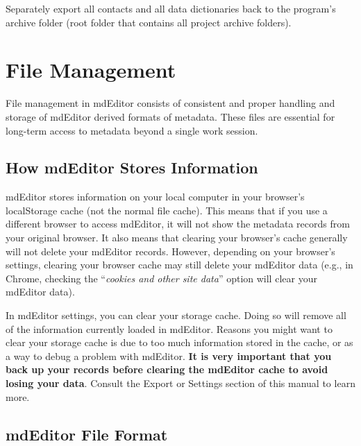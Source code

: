 \documentclass[
]{book}
\makeatletter
\newenvironment{kframe}{%
\medskip{}
\setlength{\fboxsep}{.8em}
 \def\at@end@of@kframe{}%
 \ifinner\ifhmode%
  \def\at@end@of@kframe{\end{minipage}}%
  \begin{minipage}{\columnwidth}%
 \fi\fi%
 \def\FrameCommand##1{\hskip\@totalleftmargin \hskip-\fboxsep
 \colorbox{shadecolor}{##1}\hskip-\fboxsep
     \hskip-\linewidth \hskip-\@totalleftmargin \hskip\columnwidth}%
 \MakeFramed {\advance\hsize-\width
   \@totalleftmargin\z@ \linewidth\hsize
   \@setminipage}}%
 {\par\unskip\endMakeFramed%
 \at@end@of@kframe}
\newenvironment{rmdblock}[1]
  {
  \begin{itemize}
  \renewcommand{\labelitemi}{
    \raisebox{-.7\height}[0pt][0pt]{
      {\setkeys{Gin}{width=3em,keepaspectratio}\texttt{[image: images/\#1]}}
    }
  }
  \setlength{\fboxsep}{1em}
  \begin{kframe}
  \item
  }
  {
  \end{kframe}
  \end{itemize}
  }
\newenvironment{rmdcaution}
  {\begin{rmdblock}{caution}}
  {\end{rmdblock}}
\makeatother
\begin{document}
Separately export all contacts and all data dictionaries back to the program's archive folder (root folder that contains all project archive folders).

\hypertarget{file-management}{%
\chapter*{File Management}\label{file-management}}

File management in mdEditor consists of consistent and proper handling and storage of mdEditor derived formats of metadata. These files are essential for long-term access to metadata beyond a single work session.

\hypertarget{how-mdeditor-stores-information}{%
\section*{How mdEditor Stores Information}\label{how-mdeditor-stores-information}}

mdEditor stores information on your local computer in your browser's localStorage cache (not the normal file cache). This means that if you use a different browser to access mdEditor, it will not show the metadata records from your original browser. It also means that clearing your browser's cache generally will not delete your mdEditor records. However, depending on your browser's settings, clearing your browser cache may still delete your mdEditor data (e.g., in Chrome, checking the ``\emph{cookies and other site data}'' option will clear your mdEditor data).

\begin{rmdcaution}
In mdEditor settings, you can clear your storage cache. Doing so will
remove all of the information currently loaded in mdEditor. Reasons you
might want to clear your storage cache is due to too much information
stored in the cache, or as a way to debug a problem with mdEditor.
\textbf{It is very important that you back up your records before
clearing the mdEditor cache to avoid losing your data}. Consult the
Export or Settings section of this manual to learn more.
\end{rmdcaution}

\hypertarget{mdeditor-file-format}{%
\section*{mdEditor File Format}\label{mdeditor-file-format}}
\end{document}

